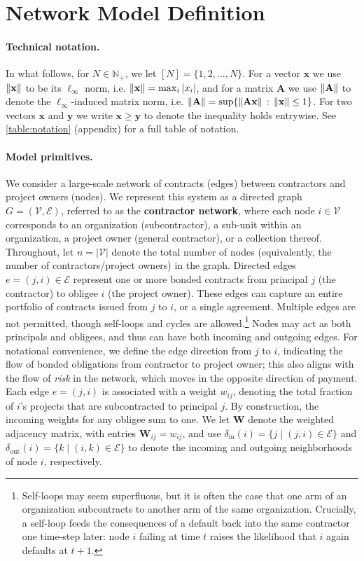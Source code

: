 \documentclass[mnsc,nonblindrev]{informs3}
\newcommand{\din}{\delta_{\text{in}}}
\newcommand{\dout}{\delta_{\text{out}}}
\newcommand{\xvec}{\mathbf{x}}
\newcommand{\A}{\mathbf{A}}
\newcommand{\W}{\mathbf{W}}
\DeclarePairedDelimiter{\norm}{\lVert}{\rVert}
\begin{document}
\section{Network Model Definition}
\label{sec:preliminary}

\paragraph{Technical notation.} In what follows, for $N \in \mathbb{N}_+$, we let $[N] = \{1, 2, \ldots, N\}$.  For a vector $\xvec$ we use $\norm{\xvec}$ to be its $\ell_\infty$ norm, i.e. $\norm{\xvec} = \max_i |x_i|$, and for a matrix $\A$ we use $\norm{\A}$ to denote the $\ell_\infty$-induced matrix norm, i.e. $\norm{\A} = \sup\{\norm{\A\xvec} \,:\, \norm{\xvec} \leq 1\}$. For two vectors $\mathbf{x}$ and $\mathbf{y}$ we write $\mathbf{x} \geq \mathbf{y}$ to denote the inequality holds entrywise.   See \cref{table:notation} (appendix) for a full table of notation.

\paragraph{Model primitives.} We consider a large-scale network of contracts (edges) between contractors and project owners (nodes). We represent this system as a directed graph $G = (\mathcal{V}, \mathcal{E})$, referred to as the {\bf contractor network}, where each node $i \in \mathcal{V}$ corresponds to an organization (subcontractor), a sub-unit within an organization, a project owner (general contractor), or a collection thereof. Throughout, let \(n = \vert\mathcal{V}\vert\) denote the total number of nodes (equivalently, the number of contractors/project owners) in the graph.  Directed edges $e = (j,i) \in \mathcal{E}$ represent one or more bonded contracts from principal $j$ (the contractor) to obligee $i$ (the project owner). These edges can capture an entire portfolio of contracts issued from $j$ to $i$, or a single agreement. Multiple edges are not permitted, though self-loops and cycles are allowed.\footnote{Self-loops may seem superfluous, but it is often the case that one arm of an organization subcontracts to another arm of the same organization.  Crucially, a self-loop feeds the consequences of a default back into the same contractor one time-step later: node $i$ failing at time $t$ raises the likelihood that $i$ again defaults at $t+1$.} Nodes may act as both principals and obligees, and thus can have both incoming and outgoing edges. For notational convenience, we define the edge direction from $j$ to $i$, indicating the flow of bonded obligations from contractor to project owner; this also aligns with the flow of {\em risk} in the network, which moves in the opposite direction of payment. Each edge $e = (j,i)$ is associated with a weight $w_{ij}$, denoting the total fraction of $i$'s projects that are subcontracted to principal $j$. By construction, the incoming weights for any obligee sum to one. We let $\W$ denote the weighted adjacency matrix, with entries $\W_{ij} = w_{ij}$, and use $\din(i) = \{j \mid (j,i) \in \mathcal{E}\}$ and $\dout(i) = \{k \mid (i,k) \in \mathcal{E}\}$ to denote the incoming and outgoing neighborhoods of node $i$, respectively.
\end{document}
